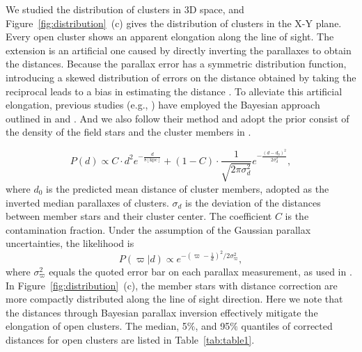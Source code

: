 \documentclass{aa} %
\begin{document}
We studied the distribution of clusters in 3D space, and Figure~\ref{fig:distribution}~(c) gives 
the distribution of clusters in the X-Y plane. Every open cluster shows an apparent 
elongation along the line of sight. The extension is an artificial one caused by directly inverting the
parallaxes to obtain the distances. Because the parallax error has a symmetric 
distribution function, introducing a skewed distribution of errors on the distance obtained by taking the reciprocal leads to a bias in estimating the distance \citep{2019A&A...627A.119C,2020ApJ...889...99Z,2021ApJ...912..162P,2022ApJ...931..156P}. 
To alleviate this artificial elongation, previous studies (e.g., \citealt{2021ApJ...912..162P, 2021AJ....162..171Y, 2022ApJ...931..156P}) have employed the Bayesian approach outlined in \cite{2015PASP..127..994B} and \citep{2019A&A...627A.119C}. And we also follow their method and adopt the prior consist of the density of the field stars and the cluster members in \citet{2021AJ....162..171Y}. 

\begin{equation}
    P\left( d \right) \propto C \cdot d^{2} e^{-\frac{d}{8 \mathrm{[kpc]}}} + \left( 1-C \right) \cdot \frac{1}{\sqrt{2\pi \sigma_{d}^{2}}}e^{-\frac{(d-d_{0})^2}{2 \sigma_{d}^{2}}},
  \end{equation}
where $d_{0}$ is the predicted mean distance of cluster members, adopted as the inverted median parallaxes of clusters. $\sigma_{d}$ is the deviation of the distances between member stars and their cluster center. The coefficient $C$ is the contamination fraction. 
Under the assumption of the Gaussian parallax uncertainties, the likelihood is 
\begin{equation}      
    P( {\varpi}|d) \propto  e^{ - ({\varpi}  - \frac{1} {d} ) ^{2}/2  \sigma_{\varpi} ^{2} },  
  \end{equation}
where $\sigma_{\varpi} ^{2}$ equals the quoted error bar on each parallax measurement, as used in \citet{2019A&A...627A.119C}.
In Figure~\ref{fig:distribution}~(c), the member stars with distance correction are more compactly 
distributed along the line of sight direction. Here we note that the distances through Bayesian parallax inversion 
effectively mitigate the elongation of open clusters. The median, 5$\%$, and 95$\%$ 
quantiles of corrected distances for open clusters are listed in Table~\ref{tab:table1}.
\end{document}
